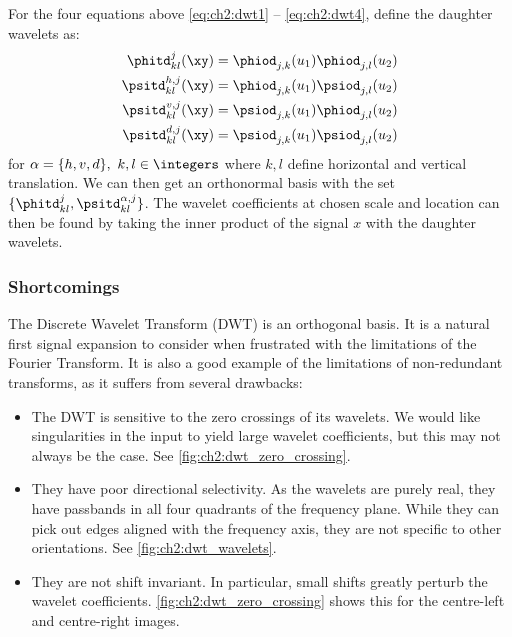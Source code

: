  For the four equations above \eqref{eq:ch2:dwt1} -- \eqref{eq:ch2:dwt4},
  define the daughter wavelets as:
  \begin{align}
    \phitd^j_{kl}(\xy) &= \phiod_{j,k}(u_1)\phiod_{j,l}(u_2) \\
    \psitd^{h,j}_{kl}(\xy) &= \phiod_{j,k}(u_1) \psiod_{j,l}(u_2) \\
    \psitd^{v,j}_{kl}(\xy) & = \psiod_{j,k}(u_1) \phiod_{j,l}(u_2) \\
    \psitd^{d,j}_{kl}(\xy) & = \psiod_{j,k}(u_1) \psiod_{j,l}(u_2) 
  \end{align}
  for $\alpha = \{h, v, d\},\ k,l \in \integers$ where $k,l$ define horizontal
  and vertical translation. We can then get an orthonormal
  basis with the set $\{ \phitd^j_{kl}, \psitd^{\alpha,j}_{kl} \}$.
  The wavelet coefficients at chosen scale and location can then be found by
  taking the inner product of the signal $x$ with the daughter wavelets.


  \subsubsection{Shortcomings}
  The Discrete Wavelet Transform (DWT) is an orthogonal basis. It is a natural
  first signal expansion to consider when frustrated with the limitations of the
  Fourier Transform. It is also a good example of the limitations of
  non-redundant transforms, as it suffers from several drawbacks:
  \begin{itemize}
    \item The DWT is sensitive to the zero crossings of its wavelets. 
      We would like singularities in the input to yield large wavelet
      coefficients, but this may not always be the case.
      See
      \autoref{fig:ch2:dwt_zero_crossing}.
    \item They have poor directional selectivity. As the wavelets are purely
      real, they have passbands in all four quadrants of the frequency plane.
      While they can pick out edges aligned with the frequency axis, they are
      not specific to other orientations. See \autoref{fig:ch2:dwt_wavelets}.
    \item They are not shift invariant. In particular, small shifts greatly
      perturb the wavelet coefficients. \autoref{fig:ch2:dwt_zero_crossing} shows
      this for the centre-left and centre-right images.
  \end{itemize}

